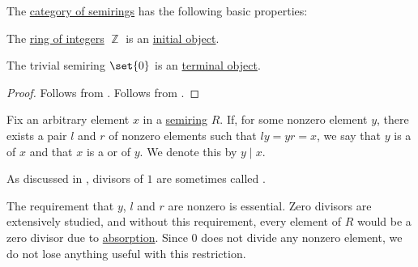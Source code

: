 \begin{proposition}\label{thm:category_of_semirings_properties}
  The \hyperref[def:semiring/category]{category of semirings} has the following basic properties:
  \begin{thmenum}
     The \hyperref[def:set_of_integers]{ring of integers} \( \BbbZ \) is an \hyperref[def:universal_objects/initial]{initial object}.

     The trivial semiring \( \set{ 0 } \) is an \hyperref[def:universal_objects/terminal]{terminal object}.
  \end{thmenum}
\end{proposition}
\begin{proof}
   Follows from .
   Follows from .
\end{proof}

\begin{definition}\label{def:semiring_division}\mimprovised
  Fix an arbitrary element \( x \) in a \hyperref[def:semiring]{semiring} \( R \). If, for some nonzero element \( y \), there exists a pair \( l \) and \( r \) of nonzero elements such that \( l y = y r = x \), we say that \( y \) is a  of \( x \) and that \( x \) is a  or  of \( y \). We denote this by \( y \mid x \).

  As discussed in , divisors of \( 1 \) are sometimes called .

  The requirement that \( y \), \( l \) and \( r \) are nonzero is essential. Zero divisors are extensively studied, and without this requirement, every element of \( R \) would be a zero divisor due to \hyperref[def:semiring/absorption]{absorption}. Since \( 0 \) does not divide any nonzero element, we do not lose anything useful with this restriction.
\end{definition}

